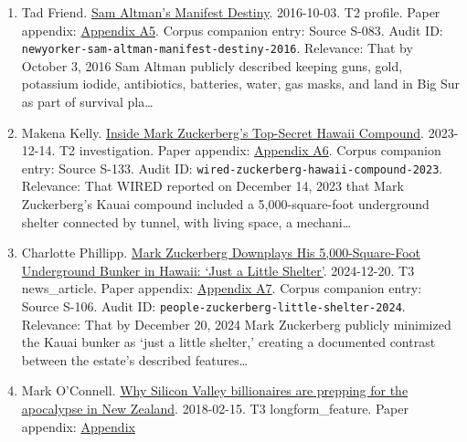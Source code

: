 \documentclass[
  american,
  11pt,
  letterpaper,
]{article}
\begin{document}
\begin{enumerate}
  \texttt{imf-gen-ai-future-of-work-2024}. Relevance: That labor-market
  exposure to generative AI is systematically uneven across geography,
  occupation, and class position.
\item
  Tad Friend.
  \href{https://www.newyorker.com/magazine/2016/10/10/sam-altmans-manifest-destiny}{Sam
  Altman's Manifest Destiny}. 2016-10-03. T2 profile. Paper appendix:
  \hyperref[ch-09-appendix-a5-sam-altman-s-manifest-destiny]{Appendix
  A5}. Corpus companion entry: Source S-083. Audit ID:
  \texttt{newyorker-sam-altman-manifest-destiny-2016}. Relevance: That
  by October 3, 2016 Sam Altman publicly described keeping guns, gold,
  potassium iodide, antibiotics, batteries, water, gas masks, and land
  in Big Sur as part of survival pla\ldots{}
\item
  Makena Kelly.
  \href{https://www.wired.com/story/mark-zuckerberg-inside-hawaii-compound}{Inside
  Mark Zuckerberg's Top-Secret Hawaii Compound}. 2023-12-14. T2
  investigation. Paper appendix:
  \hyperref[ch-09-appendix-a6-inside-mark-zuckerbergs-top-secret-hawaii-compound]{Appendix
  A6}. Corpus companion entry: Source S-133. Audit ID:
  \texttt{wired-zuckerberg-hawaii-compound-2023}. Relevance: That WIRED
  reported on December 14, 2023 that Mark Zuckerberg's Kauai compound
  included a 5,000-square-foot underground shelter connected by tunnel,
  with living space, a mechani\ldots{}
\item
  Charlotte Phillipp.
  \href{https://people.com/mark-zuckerberg-hawaii-bunker-5000-square-feet-8765376}{Mark
  Zuckerberg Downplays His 5,000-Square-Foot Underground Bunker in
  Hawaii: `Just a Little Shelter'}. 2024-12-20. T3 news\_article. Paper
  appendix:
  \hyperref[ch-09-appendix-a7-mark-zuckerberg-downplays-his-5-000-square-foot-underground-bunker-in-hawaii-just-a-little-shelter]{Appendix
  A7}. Corpus companion entry: Source S-106. Audit ID:
  \texttt{people-zuckerberg-little-shelter-2024}. Relevance: That by
  December 20, 2024 Mark Zuckerberg publicly minimized the Kauai bunker
  as `just a little shelter,' creating a documented contrast between the
  estate's described features\ldots{}
\item
  Mark O'Connell.
  \href{https://www.theguardian.com/news/2018/feb/15/why-silicon-valley-billionaires-are-prepping-for-the-apocalypse-in-new-zealand}{Why
  Silicon Valley billionaires are prepping for the apocalypse in New
  Zealand}. 2018-02-15. T3 longform\_feature. Paper appendix:
  \hyperref[ch-09-appendix-a8-why-silicon-valley-billionaires-are-prepping-for-the-apocalypse-in-new-zealand]{Appendix
}
\end{enumerate}
\end{document}
